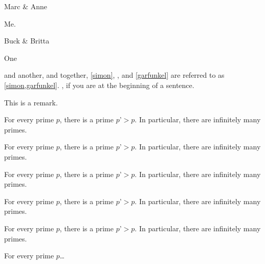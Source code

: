 \begin{couple}
Marc \& Anne
\end{couple}
\begin{singleton}
Me.
\end{singleton}
\begin{couple}
Buck \& Britta
\end{couple}

\begin{callmeal}[Simon]\label{simon}
One
\end{callmeal}
\begin{callmeal}\label{garfunkel}
and another, and together,
\autoref{simon}, ,
and \cref{garfunkel} are referred
to as \cref{simon,garfunkel}.
, if you are at
the beginning of a sentence.
\end{callmeal}


\begin{remark}[name=AAA,label=abc]
This is a remark.
\end{remark}


\begin{BoxI}[Euclid]
For every prime $p$, there is a prime $p’>p$.
In particular, there are infinitely many primes.
\end{BoxI}
\begin{BoxII}[Euclid]
For every prime $p$, there is a prime $p’>p$.
In particular, there are infinitely many primes.
\end{BoxII}

\begin{boxtheorem L}[Euclid]
For every prime $p$, there is a prime $p’>p$.
In particular, there are infinitely many primes.
\end{boxtheorem L}
\begin{boxtheorem M}[Euclid]
For every prime $p$, there is a prime $p’>p$.
In particular, there are infinitely many primes.
\end{boxtheorem M}
\begin{boxtheorem S}[Euclid]
For every prime $p$, there is a prime $p’>p$.
In particular, there are infinitely many primes.
\end{boxtheorem S}

\begin{styledtheorem}[Euclid]
For every prime $p$\dots
\end{styledtheorem}

\ifthmtools
\firsteuclid*
\else
{}
\fi

